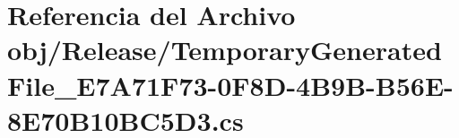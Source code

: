 \hypertarget{Release_2TemporaryGeneratedFile__E7A71F73-0F8D-4B9B-B56E-8E70B10BC5D3_8cs}{}\section{Referencia del Archivo obj/\+Release/\+Temporary\+Generated\+File\+\_\+\+E7\+A71\+F73-\/0\+F8\+D-\/4\+B9\+B-\/\+B56\+E-\/8\+E70\+B10\+B\+C5\+D3.cs}
\label{Release_2TemporaryGeneratedFile__E7A71F73-0F8D-4B9B-B56E-8E70B10BC5D3_8cs}
